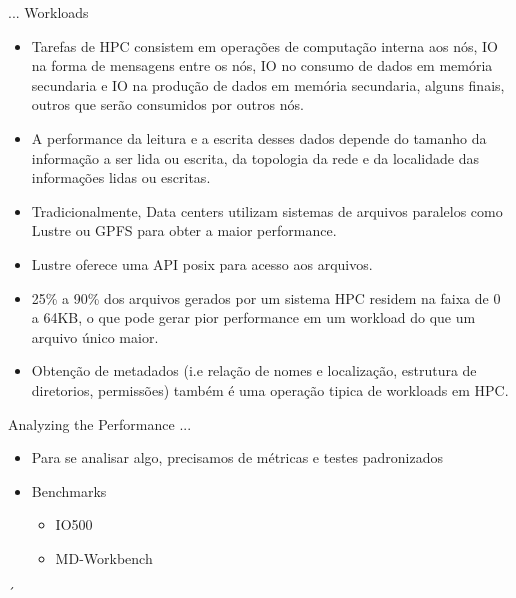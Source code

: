 \documentclass{beamer}
\begin{document}
\begin{frame}{... Workloads}
	\begin{itemize}
		\item Tarefas de HPC consistem em operações de computação interna aos nós, IO na forma de mensagens entre os nós, IO no consumo de dados em memória secundaria e IO na produção de dados em memória secundaria, alguns finais, outros que serão consumidos por outros nós.
		\pause
		\item A performance da leitura e a escrita desses dados depende do tamanho da informação a ser lida ou escrita, da topologia da rede e da localidade das informações lidas ou escritas.
		\pause
		\item Tradicionalmente, Data centers utilizam sistemas de arquivos paralelos como Lustre ou GPFS para obter a maior performance.
		\pause
		\item Lustre oferece uma API posix para acesso aos arquivos.
		\pause
		\item 25\% a 90\% dos arquivos gerados por um sistema HPC residem na faixa de 0 a 64KB, o que pode gerar pior performance em um workload do que um arquivo único maior.
		\pause
		\item Obtenção de metadados (i.e relação de nomes e localização, estrutura de diretorios, permissões) também é uma operação tipica de workloads em HPC.
	\end{itemize}
\end{frame}
\begin{frame}{Analyzing the Performance ...}
	\begin{itemize}
		\item Para se analisar algo, precisamos de métricas e testes padronizados
		\pause
		\item Benchmarks
		\begin{itemize}
			\item IO500
			\item MD-Workbench
		\end{itemize}
	\end{itemize}
´\end{frame}
\end{document}
